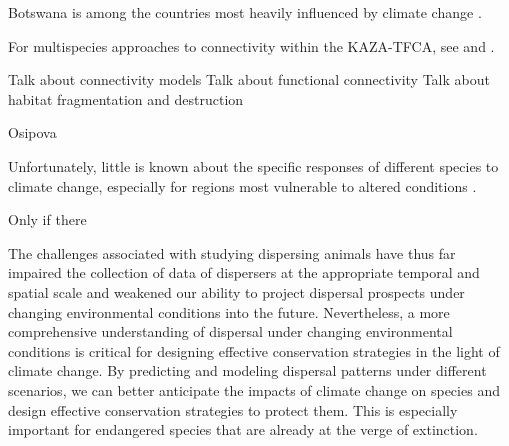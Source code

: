 \documentclass[abstract=on,10pt,a4paper,bibliography=totocnumbered]{article}
\begin{document}
Botswana is among the countries most heavily influenced by climate change .

For multispecies approaches to connectivity within the KAZA-TFCA, see
\cite{Brennan.2020} and \cite{Lines.2021}.




Talk about connectivity models
Talk about functional connectivity
Talk about habitat fragmentation and destruction

Osipova

Unfortunately, little is known about the specific responses of different species
to climate change, especially for regions most vulnerable to altered conditions
\citep{Paniw.2021}.



Only if there

The challenges associated with studying dispersing animals have thus far
impaired the collection of data of dispersers at the appropriate temporal and
spatial scale \citep{Graves.2014, Vasudev.2015} and weakened our ability to
project dispersal prospects under changing environmental conditions into the
future. Nevertheless, a more comprehensive understanding of dispersal under
changing environmental conditions is critical for designing effective
conservation strategies in the light of climate change. By predicting and
modeling dispersal patterns under different scenarios, we can better anticipate
the impacts of climate change on species and design effective conservation
strategies to protect them. This is especially important for endangered species
that are already at the verge of extinction.
\end{document}
